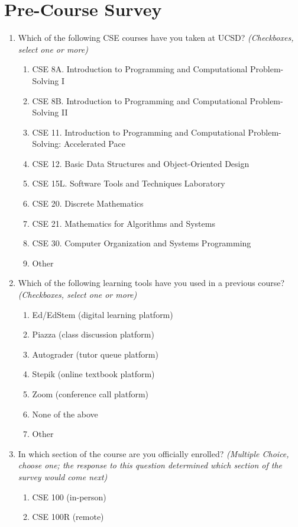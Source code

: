 \chapter{Pre-Course Survey}\label{sec:appendix_a}
\begin{enumerate}
    \item Which of the following CSE courses have you taken at UCSD? \textit{(Checkboxes, select one or more)}
    \begin{enumerate}
        \item CSE 8A. Introduction to Programming and Computational Problem-Solving I
        \item CSE 8B. Introduction to Programming and Computational Problem-Solving II
        \item CSE 11. Introduction to Programming and Computational Problem-Solving: Accelerated Pace
        \item CSE 12. Basic Data Structures and Object-Oriented Design
        \item CSE 15L. Software Tools and Techniques Laboratory
        \item CSE 20. Discrete Mathematics
        \item CSE 21. Mathematics for Algorithms and Systems
        \item CSE 30. Computer Organization and Systems Programming
        \item Other
    \end{enumerate}

    \item Which of the following learning tools have you used in a previous course? \textit{(Checkboxes, select one or more)}
    \begin{enumerate}
        \item Ed/EdStem (digital learning platform)
        \item Piazza (class discussion platform)
        \item Autograder (tutor queue platform)
        \item Stepik (online textbook platform)
        \item Zoom (conference call platform)
        \item None of the above
        \item Other
    \end{enumerate}

    \item In which section of the course are you officially enrolled? \textit{(Multiple Choice, choose one; the response to this question determined which section of the survey would come next)}
    \begin{enumerate}
        \item CSE 100 (in-person)
        \item CSE 100R (remote)
    \end{enumerate}


\end{enumerate}
